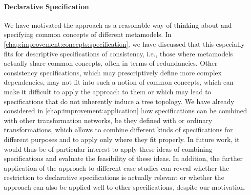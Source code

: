 \paragraph{Declarative Specification}
We have motivated the \commonalities approach as a reasonable way of thinking about and specifying common concepts of different metamodels.
In \autoref{chap:improvement:concepts:specification}, we have discussed that this especially fits for descriptive specifications of consistency, i.e., those where metamodels actually share common concepts, often in terms of redundancies.
Other consistency specifications, which may prescriptively define more complex dependencies, may not fit into such a notion of common concepts, which can make it difficult to apply the \commonalities approach to them or which may lead to specifications that do not inherently induce a tree topology.
We have already considered in \autoref{chap:improvement:application} how \commonalities specifications can be combined with other transformation networks, be they defined with \commonalities or ordinary transformations, which allows to combine different kinds of specifications for different purposes and to apply \commonalities only where they fit properly.
In future work, it would thus be of particular interest to apply these ideas of combining specifications and evaluate the feasibility of these ideas.
In addition, the further application of the approach to different case studies can reveal whether the restriction to declarative specifications is actually relevant or whether the approach can also be applied well to other specifications, despite our motivation.


